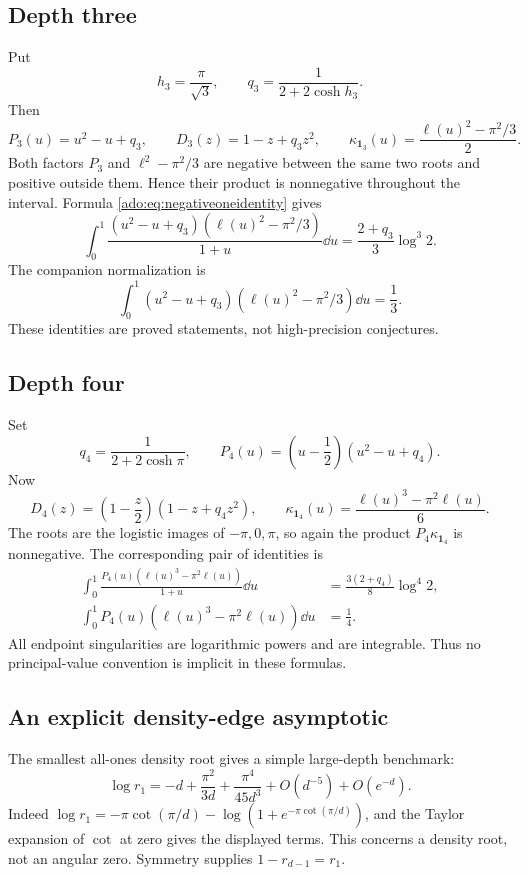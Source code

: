 \subsection{Depth three}
Put
\[
 h_3=\frac\pi{\sqrt3},\qquad
 q_3=\frac1{2+2\cosh h_3}.
\]
Then
\[
 P_3(u)=u^2-u+q_3,\qquad
 D_3(z)=1-z+q_3z^2,\qquad
 \kappa_{\boldsymbol{1}_3}(u)=\frac{\ell(u)^2-\pi^2/3}{2}.
\]
Both factors $P_3$ and $\ell^2-\pi^2/3$ are negative between the
same two roots and positive outside them. Hence their product is
nonnegative throughout the interval. Formula
\eqref{ado:eq:negativeoneidentity} gives
\begin{equation}\label{ado:eq:depththreeidentity}
 \boxed{
 \int_0^1\frac{(u^2-u+q_3)(\ell(u)^2-\pi^2/3)}{1+u}\dd u
 =\frac{2+q_3}{3}\log^3 2.}
\end{equation}
The companion normalization is
\begin{equation}\label{ado:eq:depththreenormalization}
 \int_0^1 (u^2-u+q_3)(\ell(u)^2-\pi^2/3)\dd u=\frac13.
\end{equation}
These identities are proved statements, not high-precision conjectures.

\subsection{Depth four}
Set
\[
 q_4=\frac1{2+2\cosh\pi},\qquad
 P_4(u)=\left(u-\frac12\right)(u^2-u+q_4).
\]
Now
\[
 D_4(z)=\left(1-\frac z2\right)(1-z+q_4z^2),\qquad
 \kappa_{\boldsymbol{1}_4}(u)=\frac{\ell(u)^3-\pi^2\ell(u)}6.
\]
The roots are the logistic images of $-\pi,0,\pi$, so again the
product $P_4\kappa_{\boldsymbol{1}_4}$ is nonnegative. The corresponding pair
of identities is
\begin{align}
 \int_0^1\frac{P_4(u)(\ell(u)^3-\pi^2\ell(u))}{1+u}\dd u
 &=\frac{3(2+q_4)}8\log^4 2,
 \label{ado:eq:depthfouridentity}\\
 \int_0^1P_4(u)(\ell(u)^3-\pi^2\ell(u))\dd u&=\frac14.
 \label{ado:eq:depthfournormalization}
\end{align}
All endpoint singularities are logarithmic powers and are integrable.
Thus no principal-value convention is implicit in these formulas.

\subsection{An explicit density-edge asymptotic}
The smallest all-ones density root gives a simple large-depth benchmark:
\begin{equation}\label{ado:eq:edgeasymptotic}
 \log r_1=-d+\frac{\pi^2}{3d}+\frac{\pi^4}{45d^3}
             +O(d^{-5})+O(e^{-d}).
\end{equation}
Indeed $\log r_1=-\pi\cot(\pi/d)
-\log(1+e^{-\pi\cot(\pi/d)})$, and the Taylor expansion of $\cot$
at zero gives the displayed terms. This concerns a density root, not
an angular zero. Symmetry supplies $1-r_{d-1}=r_1$.

